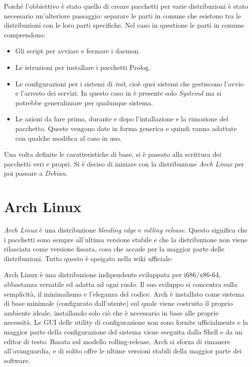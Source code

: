 \documentclass[10pt,titlepage,twoside,a4paper]{report}
\begin{document}
Poiché l'obbiettivo è stato quello di creare pacchetti per varie 
distribuzioni è stato necessario un'ulteriore passaggio: separare le parti in 
comune che esistono tra le distribuzioni con le loro parti specifiche. Nel 
caso in questione le parti in comune comprendono:
\begin{itemize}
    \item Gli script per avviare e fermare i daemon.
    \item Le istruzioni per installare i pacchetti Prolog.
    \item Le configurazioni per i sistemi di \emph{init}, cioè quei sistemi 
che gestiscono l'avvio e l'arresto dei servizi. In questo caso in è 
presente solo \emph{Systemd} ma si potrebbe generalizzare per qualunque 
sistema.
    \item Le azioni da fare prima, durante e dopo l'intallazione e la rimozione 
del pacchetto. Queste vengono date in forma generica e quindi vanno adattate 
con qualche modifica al caso in uso.
\end{itemize}

Una volta definite le caratteristiche di base, si è passato alla scrittura dei
pacchetti veri e propri. Si è deciso di iniziare con la
distribuzione \emph{Arch Linux} per poi passare a \emph{Debian}.


\section{Arch Linux}
\emph{Arch Linux} è una distribuzione \emph{bleeding edge} e \emph{rolling 
release}. Questo significa che i pacchetti sono sempre all'ultima versione 
stabile e che la distribuzione non viene rilasciata come versione fissata, 
cosa che accade per la maggior parte delle distribuzioni. Tutto questo è 
speigato nella wiki ufficiale\cite{archLinux}:
\begin{displayquote}
Arch Linux è una distribuzione indipendente sviluppata per i686/x86-64, 
abbastanza versatile ed adatta ad ogni ruolo. Il suo sviluppo si concentra 
sulla semplicità, il minimalismo e l'eleganza del codice. Arch è installato 
come sistema di base minimale (configurato dall'utente) sul quale viene 
costruito il proprio ambiente ideale, installando solo ciò che è necessario 
in base alle proprie necessità. Le GUI delle utility di configurazione non 
sono fornite ufficialmente e la maggior parte della configurazione del sistema viene 
eseguita dalla Shell e da un editor di testo. Basata sul modello 
rolling-release, Arch si sforza di rimanere all'avanguardia, e di solito offre 
le ultime versioni stabili della maggior parte dei software.
\end{displayquote}
\end{document}

